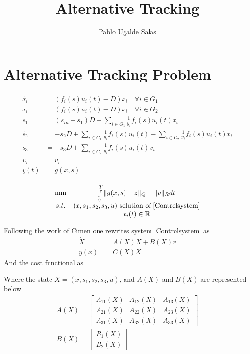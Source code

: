 \documentclass[3p,times]{article}
\title{Alternative Tracking}
\author{Pablo Ugalde Salas}
\newcommand{\R}{\mathbb{R}}
\begin{document}
\maketitle

\section{Alternative Tracking Problem}


\begin{align} 
\label{Controlsystem}
\begin{array}{cl}
\dot{x_i} &= \left(f_i(s)u_i(t) -D \right)x_i \quad \forall i \in G_1\\
\dot{x_i} &= \left(f_i(s)u_i(t) -D \right)x_i \quad \forall i \in G_2\\
\dot{s_1} &= \displaystyle (s_{in}-s_1)D-\sum\limits_{i \in G_1}\frac{1}{y_i}f_i(s)u_i(t) x_i  \\
\dot{s_2} &= \displaystyle -s_2D+\sum\limits_{i \in G_1}\frac{1}{y_i}f_i(s)u_i(t)	-\sum\limits_{i \in G_2}\frac{1}{y_i}f_i(s)u_i(t) x_i  \\
\dot{s_3} &=  \displaystyle -s_3D+\sum\limits_{i \in G_2}\frac{1}{y_i}f_i(s)u_i(t) x_i \\
\dot{u_i} &= v_i\\
y(t) & = g(x,s)
\end{array}
\end{align}	


\begin{align}
\label{Optimal Control} \begin{array}{cc} \min &  \int \limits_{0}^{T} \Vert g(x,s) - z \Vert_Q + \Vert v \Vert_R dt\\
s.t.& 
(x,s_1,s_2,s_3,u) \mbox{ solution of \eqref{Controlsystem}} \\
&v_i(t) \in \R
\end{array}	
\end{align} 

Following the work of Cimen one rewrites system \eqref{Controlsystem} as 
\begin{align}
\dot{X} &= A(X)X + B(X)v \\
y(x) & = C(X)X
\end{align}
And the cost functional as


Where the state $X = (x,s_1,s_2,s_3,u)$, and $A(X)$ and $B(X)$ are represented below
\begin{align}
\label{A_matrix} A\left (X\right) = \begin{bmatrix}
A_{11}(X) & A_{12}(X) & A_{13}(X)\\ A_{21}(X) & A_{22}(X) & A_{23}(X) \\
A_{31}(X) & A_{32}(X) & A_{33}(X)
\end{bmatrix} \\
\label{B_matrix} B\left (X\right) = \begin{bmatrix}
B_1(X) \\ B_2(X)
\end{bmatrix} 
\end{align}
\end{document}
